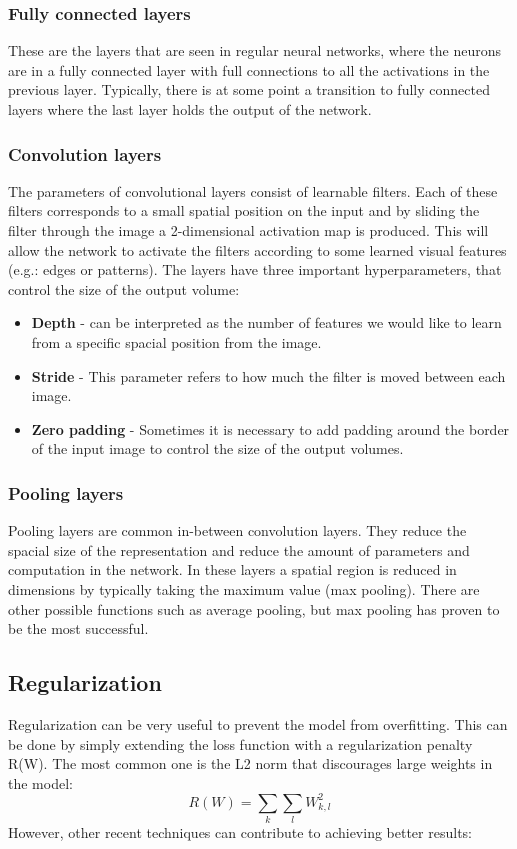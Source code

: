 \documentclass[10pt,a4paper]{article}
\begin{document}
\subsubsection{Fully connected layers}
These are the layers that are seen in regular neural networks, where the neurons are in a fully connected layer with full connections to all the activations in the previous layer. Typically, there is at some point a transition to fully connected layers where the last layer holds the output of the network.

\subsubsection{Convolution layers}
The parameters of convolutional layers consist of learnable filters. Each of these filters corresponds to a small spatial position on the input and by sliding the filter through the image a 2-dimensional activation map is produced. This will allow the network to activate the filters according to some learned visual features (e.g.: edges or patterns). The layers have three important hyperparameters, that control the size of the output volume:
\begin{itemize}
\item \textbf{Depth} - can be interpreted as the number of features we would like to learn from a specific spacial position from the image. 
\item \textbf{Stride} - This parameter refers to how much the filter is moved between each image.
\item \textbf{Zero padding} - Sometimes it is necessary to add padding around the border of the input image to control the size of the output volumes.
\end{itemize}

\subsubsection{Pooling layers}
Pooling layers are common in-between convolution layers. They reduce the spacial size of the representation and reduce the amount of parameters and computation in the network. In these layers a spatial region is reduced in dimensions by typically taking the maximum value (max pooling). There are other possible functions such as average pooling, but max pooling has proven to be the most successful.

\subsection{Regularization}
Regularization can be very useful to prevent the model from overfitting. This can be done by simply extending the loss function with a regularization penalty R(W). The most common one is the L2 norm that discourages large weights in the model: $$ R(W) = \sum_{k} \sum_{l} W_{k,l}^2$$ However, other recent techniques can contribute to achieving better results:
\end{document}

